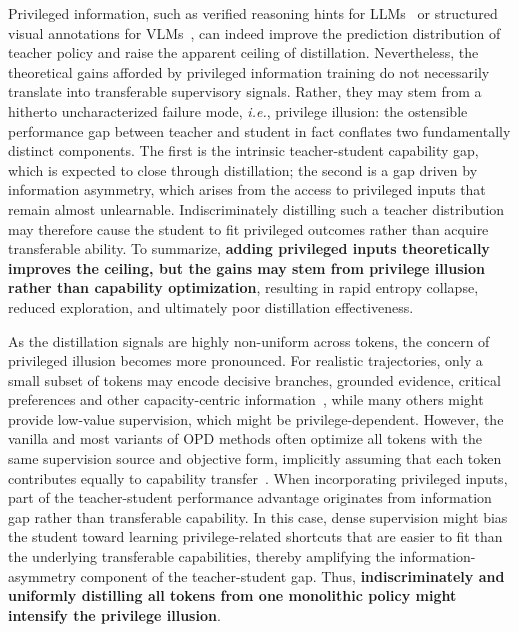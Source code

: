 \documentclass[]{jingdong}
\theoremstyle{plain}
\theoremstyle{definition}
\theoremstyle{remark}
\begin{document}
Privileged information, such as verified reasoning hints for LLMs~\citep{penaloza2026privileged,zhao2026self,hubotter2026reinforcement,yang2026self} or structured visual annotations for VLMs~\citep{yuan2026vision,liu2026visual}, can indeed improve the prediction distribution of teacher policy and raise the apparent ceiling of distillation. 
Nevertheless, the theoretical gains afforded by privileged information training do not necessarily translate into transferable supervisory signals. Rather, they may stem from a hitherto uncharacterized failure mode, \textit{i.e.}, privilege illusion: the ostensible performance gap between teacher and student in fact conflates two fundamentally distinct components. The first is the intrinsic teacher-student capability gap, which is expected to close through distillation; the second is a gap driven by information asymmetry, which arises from the access to privileged inputs that remain almost unlearnable.
Indiscriminately distilling such a teacher distribution may therefore cause the student to fit privileged outcomes rather than acquire transferable ability. 
To summarize, \textbf{adding privileged inputs theoretically improves the ceiling, but the gains may stem from privilege illusion rather than capability optimization}, resulting in rapid entropy collapse, reduced exploration, and ultimately poor distillation effectiveness.



As the distillation signals are highly non-uniform across tokens, the concern of privileged illusion becomes more pronounced.
For realistic trajectories, only a small subset of tokens may encode decisive branches, grounded evidence, critical preferences and other capacity-centric information~\citep{xu2026tip,jin2026entropy}, while many others might provide low-value supervision, which might be privilege-dependent.
However, the vanilla and most variants of OPD methods often optimize all tokens with the same supervision source and objective form, implicitly assuming that each token contributes equally to capability transfer~\citep{thinking2025opd,li2026rethinking,song2026survey}. When incorporating privileged inputs, part of the teacher-student performance advantage originates from information gap rather than transferable capability. In this case, dense supervision might bias the student toward learning privilege-related shortcuts that are easier to fit than the underlying transferable capabilities, thereby amplifying the information-asymmetry component of the teacher-student gap.
Thus, \textbf{indiscriminately and uniformly distilling all tokens from one monolithic policy might intensify the privilege illusion}.
\end{document}
